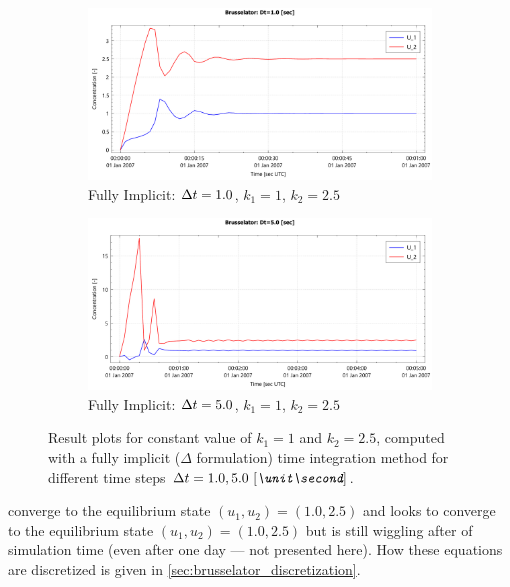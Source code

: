 \begin{figure}[H]
    \begin{subfigure}{0.5\textwidth}
        \includegraphics[width=\textwidth]{figures/brusselator_imp_dt=1d00.pdf}
        \caption{Fully Implicit: $\Delta t=1.0$, $k_1=1$, $k_2=2.5$}\label{fig:imp_dt=1d00}
    \end{subfigure}
    \begin{subfigure}{0.5\textwidth}
        \includegraphics[width=\textwidth]{figures/brusselator_imp_dt=5d00.pdf}
        \caption{Fully Implicit: $\Delta t=5.0$, $k_1=1$, $k_2=2.5$}\label{fig:imp_dt=5d00}
    \end{subfigure}
    \caption[Brusselator experiment: $\Dt = 1.0, 5.0\ \bunit{\second}$]{Result plots for constant value of $k_1 = 1$ and $k_2 =2.5$, computed with a fully implicit ($\Delta$ formulation) time integration method for different time steps $\Dt = 1.0, 5.0\ \bunit{\second}$.
    }
\end{figure}
 converge to the equilibrium state $(u_1, u_2) = (1.0, 2.5)$ and
 looks to converge to the equilibrium state $(u_1, u_2) = (1.0, 2.5)$ but is still wiggling after  of simulation time (even after one day --- not presented here).
How these equations are discretized is given in \autoref{sec:brusselator_discretization}.

